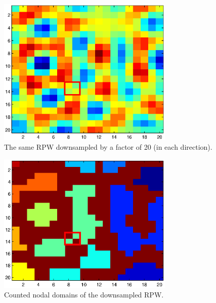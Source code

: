 \documentclass{article}
\begin{document}
\begin{figure}[h]
  \begin{center}
    \includegraphics[width=0.75\textwidth]{figures/interpolation/low_res_rpw_with_rect.eps}
    \caption{The same RPW downsampled by a factor of 20 (in each direction).}
  \end{center}
\end{figure}

\begin{figure}[h]
  \begin{center}
    \includegraphics[width=0.75\textwidth]{figures/interpolation/low_res_domains_counted_with_rect.eps}
    \caption{Counted nodal domains of the downsampled RPW.}
  \end{center}
\end{figure}
\end{document}
